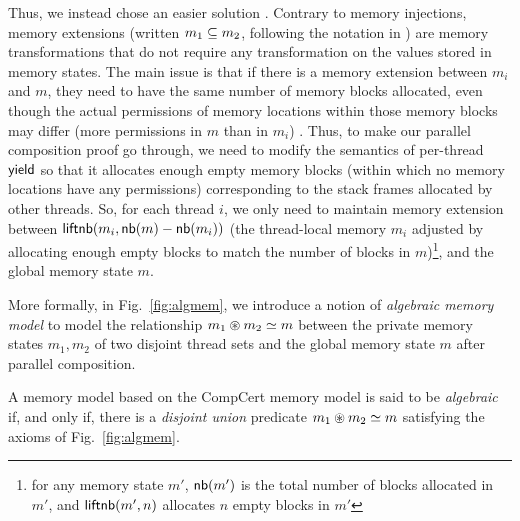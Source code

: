 Thus, we instead chose an easier solution \cite[\S 5.2]{leroy08}. Contrary to memory injections,
memory extensions (written ${m_1} \subseteq {m_2}$, following the
notation in \cite[\S 5.2]{leroy08}) are memory transformations that do
not require any transformation on the values
stored in memory states. The main issue is that if there is a memory
extension between $m_i$ and $m$, they need to have the same number of
memory blocks allocated, even though the actual permissions of memory
locations within those memory blocks may differ (more permissions in
$m$ than in $m_i$) \cite{compcert-mem-v2}. Thus, to make our parallel composition proof go
through, we need to modify the semantics of per-thread $\mathsf{yield}$ so
that it allocates enough empty memory blocks (within which no memory
locations have any permissions) corresponding to the stack frames
allocated by other threads. So, for each thread $i$, we only need to
maintain memory extension between $\mathsf{liftnb}({m_i}, {\mathsf{nb}({m}) -
\mathsf{nb}({m_i})})$ (the thread-local memory $m_i$ adjusted by
allocating enough empty blocks to match the number of blocks in $m$)\footnote{for any memory state $m'$,
$\mathsf{nb}({m'})$ is the total number of blocks allocated in $m'$, and
$\mathsf{liftnb}({m'}, {n})$ allocates $n$ empty blocks in $m'$},
and the global memory state $m$.


More formally, in Fig.~\ref{fig:algmem}, we introduce a notion of \emph{algebraic memory model}
to model the relationship ${m_1} \circledast {m_2} \simeq {m}$ between the private memory states $m_1, m_2$ of two disjoint
thread sets and the global memory state $m$ after parallel composition.
\begin{definition} \label{def:algmem}
A memory model based on the CompCert memory model \cite{leroy08} is
said to be \emph{algebraic} if, and only if, there is a \emph{disjoint
  union} predicate ${m_1} \circledast {m_2} \simeq {m}$ satisfying
the axioms of Fig.~\ref{fig:algmem}.
\end{definition}

